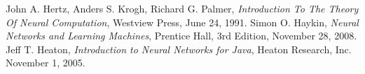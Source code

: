 \documentclass[10pt,a4paper]{article}
\begin{document}
\subtitulo{}


\grupo{}


\maketitle

\tableofcontents
\newpage


\newpage


\newpage


\newpage


\newpage


\newpage



\begin{thebibliography}{9}
    John A. Hertz, Anders S. Krogh, Richard G. Palmer,
    \emph{Introduction To The Theory Of Neural Computation},
    Westview Press,
    June 24, 1991.
    Simon O. Haykin,
    \emph{Neural Networks and Learning Machines},
    Prentice Hall,
    3rd Edition,
    November 28, 2008.
    Jeff T. Heaton,
    \emph{Introduction to Neural Networks for Java},
    Heaton Research, Inc.
    November 1, 2005.
\end{thebibliography}
\end{document}
